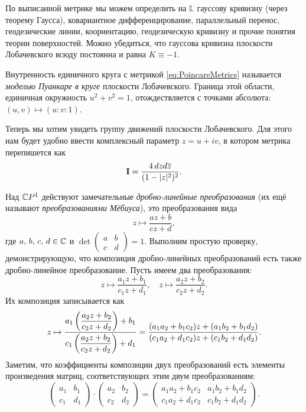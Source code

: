 По выписанной метрике мы можем определить на $\mathbb{L}$ гауссову кривизну (через теорему Гаусса), ковариантное дифференцирование, параллельный перенос, геодезические линии, коориентацию, геодезическую кривизну и прочие понятия теории поверхностей. Можно убедиться, что гауссова кривизна плоскости Лобачевского всюду постоянна и равна $K \equiv -1$.

Внутренность единичного круга с метрикой \eqref{eq:PoincareMetrics} называется \textit{моделью Пуанкаре в круге} плоскости Лобачевского. Граница этой области, единичная окружность $u^2 + v^2 = 1$, отождествляется с точками абсолюта: $(u, v) \mapsto (u : v : 1)$.

Теперь мы хотим увидеть группу движений плоскости Лобачевского. Для этого нам будет удобно ввести комплексный параметр $z = u + iv$, в котором метрика перепишется как
\begin{equation} \label{eq:zMetrics}
	\boldsymbol{\operatorname{I}} = \frac{4\,dzd\overline{z}}{(1 - |z|^2)^2}.
\end{equation}

Над $\mathbb{C} P^1$ действуют замечательные \textit{дробно-линейные преобразования} (их ещё называют \textit{преобразованиями Мёбиуса}), это преобразования вида
\[
	z \mapsto \frac{az + b}{cz + d},
\]
где $a,\,b,\,c,\,d \in \mathbb{C}$ и
$\det\begin{pmatrix}
	a & b\\
	c & d
\end{pmatrix} = 1$. Выполним простую проверку, демонстрирующую, что композиция дробно-линейных преобразований есть также дробно-линейное преобразование. Пусть имеем два преобразования:
\[
	z \mapsto \frac{a_1z + b_1}{c_1z + d_1},\quad
	z \mapsto \frac{a_2z + b_2}{c_2z + d_2}.
\]
Их композиция записывается как
\[
	z \mapsto \frac{a_1\left(\dfrac{a_2z + b_2}{c_2z + d_2}\right) + b_1}{c_1\left(\dfrac{a_2z + b_2}{c_2z + d_2}\right) + d_1} = \frac{(a_1a_2 + b_1c_2)z + (a_1b_2 + b_1d_2)}{(c_1a_2 + d_1c_2)z + (c_1b_2 + d_1d_2)}.
\]
Заметим, что коэффициенты композиции двух преобразований есть элементы произведения матриц, соответствующих этим двум преобразованиям:
\[
	\begin{pmatrix}
		a_1 & b_1\\
		c_1 & d_1
	\end{pmatrix} \cdot
	\begin{pmatrix}
		a_2 & b_2\\
		c_2 & d_2
	\end{pmatrix} =
	\begin{pmatrix}
		a_1a_2 + b_1c_2 & a_1b_2 + b_1d_2\\
		c_1a_2 + d_1c_2 & c_1b_2 + d_1d_2
	\end{pmatrix}.
\]

